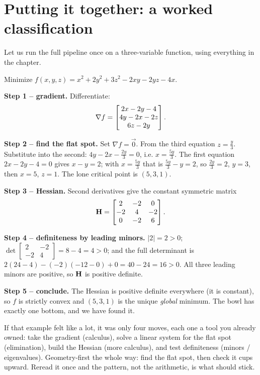 \section{Putting it together: a worked classification}
\label{ch36:worked}

Let us run the full pipeline once on a three-variable function, using everything in
the chapter.

\begin{example}
\label{ch36:ex-endtoend}
Minimize $f(x,y,z) = x^2 + 2y^2 + 3z^2 - 2xy - 2yz - 4x$.

\textbf{Step 1 -- gradient.} Differentiate:
\[
  \nabla f = \begin{bmatrix}2x - 2y - 4 \\ 4y - 2x - 2z \\ 6z - 2y\end{bmatrix}.
\]

\textbf{Step 2 -- find the flat spot.} Set $\nabla f = \vec0$. From the third
equation $z=\tfrac{y}{3}$. Substitute into the second: $4y-2x-\tfrac{2y}{3}=0$, i.e.
$x=\tfrac{5y}{3}$. The first equation $2x-2y-4=0$ gives $x-y=2$; with $x=\tfrac{5y}3$
that is $\tfrac{5y}{3}-y=2$, so $\tfrac{2y}{3}=2$, $y=3$, then $x=5$, $z=1$. The lone
critical point is $(5,3,1)$.

\textbf{Step 3 -- Hessian.} Second derivatives give the constant symmetric matrix
\[
  \mathbf{H}=\begin{bmatrix} 2 & -2 & 0 \\ -2 & 4 & -2 \\ 0 & -2 & 6 \end{bmatrix}.
\]

\textbf{Step 4 -- definiteness by leading minors.} $|2|=2>0$;
$\det\begin{bmatrix}2&-2\\-2&4\end{bmatrix}=8-4=4>0$; and the full determinant is
$2(24-4) - (-2)(-12-0) + 0 = 40 - 24 = 16 > 0$. All three leading minors are
positive, so $\mathbf{H}$ is positive definite.

\textbf{Step 5 -- conclude.} The Hessian is positive definite everywhere (it is
constant), so $f$ is strictly convex and $(5,3,1)$ is the unique \emph{global}
minimum. The bowl has exactly one bottom, and we have found it.
\end{example}

\begin{recoverybox}
If that example felt like a lot, it was only four moves, each one a tool you
already owned: take the gradient (calculus), solve a linear system for the flat spot
(elimination), build the Hessian (more calculus), and test definiteness (minors /
eigenvalues). Geometry-first the whole way: find the flat spot, then check it cups
upward. Reread it once and the pattern, not the arithmetic, is what should stick.
\end{recoverybox}

